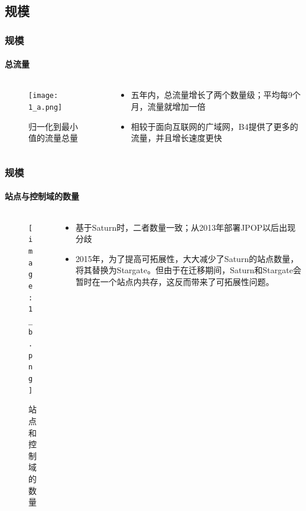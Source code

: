 \subsection{规模}
\begin{frame}
    \frametitle{规模}
    \framesubtitle{总流量}
    \begin{columns}
        \begin{column}{0.4\textwidth}
            \begin{figure}
                \centering
                \texttt{[image: 1\_a.png]}
                \caption{归一化到最小值的流量总量}
            \end{figure}
        \end{column}

        \begin{column}{0.6\textwidth}
            \begin{itemize}
                \item 五年内，总流量增长了两个数量级；平均每9个月，流量就增加一倍
                \item 相较于面向互联网的广域网，B4提供了更多的流量，并且增长速度更快
            \end{itemize}
        \end{column}
    \end{columns}
\end{frame}

\begin{frame}
    \frametitle{规模}
    \framesubtitle{站点与控制域的数量}
    \begin{columns}
        \begin{column}{0.4\textwidth}
            \begin{figure}
                \centering
                \texttt{[image: 1\_b.png]}
                \caption{站点和控制域的数量}
            \end{figure}
        \end{column}

        \begin{column}{0.6\textwidth}
            \begin{itemize}
                \item 基于Saturn时，二者数量一致；从2013年部署JPOP以后出现分歧
                \item 2015年，为了提高可拓展性，大大减少了Saturn的站点数量，将其替换为Stargate。但由于在迁移期间，Saturn和Stargate会暂时在一个站点内共存，这反而带来了可拓展性问题。
            \end{itemize}
        \end{column}
    \end{columns}
\end{frame}

